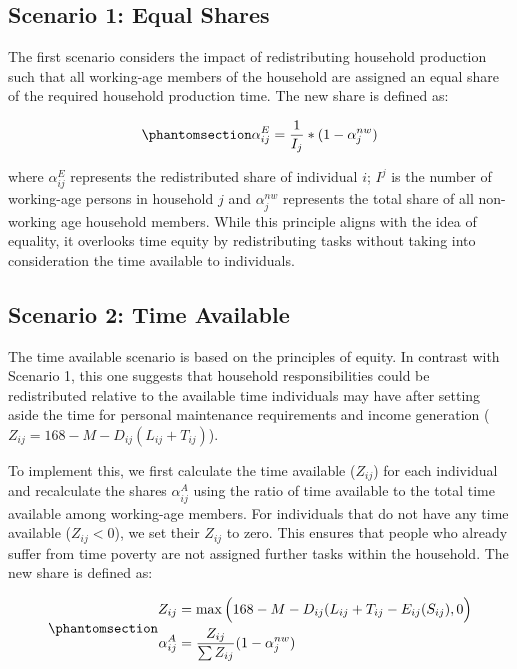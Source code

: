 \documentclass[
  11pt,
]{article}
\begin{document}
\subsection{Scenario 1: Equal Shares}\label{scenario-1-equal-shares}

The first scenario considers the impact of redistributing household
production such that all working-age members of the household are
assigned an equal share of the required household production time. The
new share is defined as:

\begin{equation}\phantomsection\label{eq-r1}{\alpha_{ij}^E= \frac{1}{I_j}*(1-\alpha_{j}^{nw})
}\end{equation}

where \(\alpha_{ij}^E\) represents the redistributed share of individual
\(i\); \(I^j\) is the number of working-age persons in household \(j\)
and \(\alpha_{j}^{nw}\) represents the total share of all non-working
age household members. While this principle aligns with the idea of
equality, it overlooks time equity by redistributing tasks without
taking into consideration the time available to individuals.

\subsection{Scenario 2: Time Available}\label{scenario-2-time-available}

The time available scenario is based on the principles of equity. In
contrast with Scenario 1, this one suggests that household
responsibilities could be redistributed relative to the available time
individuals may have after setting aside the time for personal
maintenance requirements and income generation
(\(Z_{ij}=168-M-D_{ij}(L_{ij}+T_{ij})\)).

To implement this, we first calculate the time available (\(Z_{ij}\))
for each individual and recalculate the shares \(\alpha_{ij}^A\) using
the ratio of time available to the total time available among
working-age members. For individuals that do not have any time available
(\(Z_{ij}<0\)), we set their \(Z_{ij}\) to zero. This ensures that
people who already suffer from time poverty are not assigned further
tasks within the household. The new share is defined as:

\begin{equation}\phantomsection\label{eq-r2}{
\begin{aligned}
Z_{ij} &=\max{\Big(168-M-D_{ij}(L_{ij}+T_{ij}-E_{ij}(S_{ij}),0\Big)} \\
\alpha_{ij}^A &= \frac{Z_{ij}}{\sum Z_{ij}} (1-\alpha_{j}^{nw})
\end{aligned}
}\end{equation}
\end{document}
